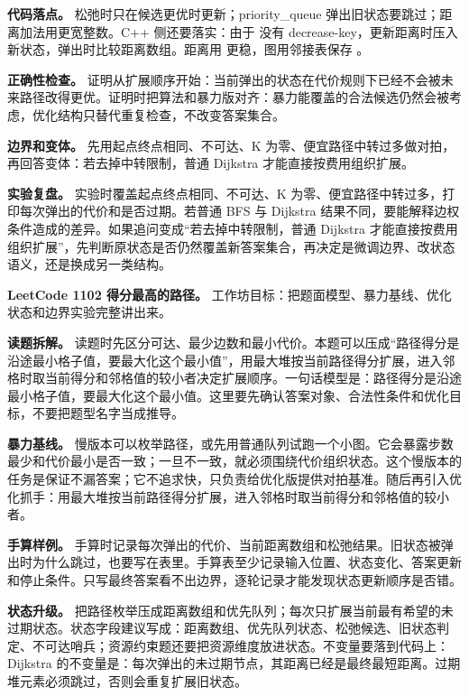 \textbf{代码落点。} 松弛时只在候选更优时更新；priority\_queue 弹出旧状态要跳过；距离加法用更宽整数。C++ 侧还要落实：由于  没有 decrease-key，更新距离时压入新状态，弹出时比较距离数组。距离用  更稳，图用邻接表保存 。

\textbf{正确性检查。} 证明从扩展顺序开始：当前弹出的状态在代价规则下已经不会被未来路径改得更优。证明时把算法和暴力版对齐：暴力能覆盖的合法候选仍然会被考虑，优化结构只替代重复检查，不改变答案集合。

\textbf{边界和变体。} 先用起点终点相同、不可达、K 为零、便宜路径中转过多做对拍，再回答变体：若去掉中转限制，普通 Dijkstra 才能直接按费用组织扩展。

\textbf{实验复盘。} 实验时覆盖起点终点相同、不可达、K 为零、便宜路径中转过多，打印每次弹出的代价和是否过期。若普通 BFS 与 Dijkstra 结果不同，要能解释边权条件造成的差异。如果追问变成“若去掉中转限制，普通 Dijkstra 才能直接按费用组织扩展”，先判断原状态是否仍然覆盖新答案集合，再决定是微调边界、改状态语义，还是换成另一类结构。

\noindent\textbf{LeetCode 1102 得分最高的路径。} 工作坊目标：把题面模型、暴力基线、优化状态和边界实验完整讲出来。

\textbf{读题拆解。} 读题时先区分可达、最少边数和最小代价。本题可以压成“路径得分是沿途最小格子值，要最大化这个最小值”，用最大堆按当前路径得分扩展，进入邻格时取当前得分和邻格值的较小者决定扩展顺序。一句话模型是：路径得分是沿途最小格子值，要最大化这个最小值。这里要先确认答案对象、合法性条件和优化目标，不要把题型名字当成推导。

\textbf{暴力基线。} 慢版本可以枚举路径，或先用普通队列试跑一个小图。它会暴露步数最少和代价最小是否一致；一旦不一致，就必须围绕代价组织状态。这个慢版本的任务是保证不漏答案；它不追求快，只负责给优化版提供对拍基准。随后再引入优化抓手：用最大堆按当前路径得分扩展，进入邻格时取当前得分和邻格值的较小者。

\textbf{手算样例。} 手算时记录每次弹出的代价、当前距离数组和松弛结果。旧状态被弹出时为什么跳过，也要写在表里。手算表至少记录输入位置、状态变化、答案更新和停止条件。只写最终答案看不出边界，逐轮记录才能发现状态更新顺序是否错。

\textbf{状态升级。} 把路径枚举压成距离数组和优先队列；每次只扩展当前最有希望的未过期状态。状态字段建议写成：距离数组、优先队列状态、松弛候选、旧状态判定、不可达哨兵；资源约束题还要把资源维度放进状态。不变量要落到代码上：Dijkstra 的不变量是：每次弹出的未过期节点，其距离已经是最终最短距离。过期堆元素必须跳过，否则会重复扩展旧状态。

